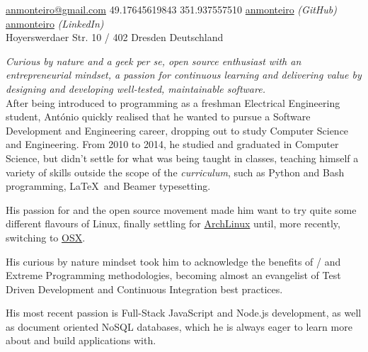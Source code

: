 \documentclass[10pt,a4paper]{article}
\begin{document}
\sloppy  %



\nobreakvspace{0.3em}  %

\noindent\href{mailto:anmonteiro.at.gmail.dot.com}{anmonteiro\mbox{}@\mbox{}gmail.com}\sbull
\textsmaller{+}49.17645619843\sbull
\textsmaller{+}351.937557510\sbull
{\newnums \href{http://www.github.com/anmonteiro}{anmonteiro}} \emph{(GitHub)}\sbull
\href{http://www.linkedin.com/in/anmonteiro}{anmonteiro} \emph{(LinkedIn)}
\\
Hoyerswerdaer Str. 10 / 402 Dresden\sbull
Deutschland

\spacedhrule{0.9em}{-0.4em}  %


\vspace{-1.3em}  %
\begin{multicols}{2}  %
\emph{Curious by nature and a geek \emph{per se}, open source enthusiast with an entrepreneurial mindset, a passion for continuous learning and delivering value by designing and developing well-tested, maintainable software.}\\

After being introduced to programming as a freshman Electrical Engineering student, António quickly realised that he wanted to pursue a Software Development and Engineering career, dropping out to study Computer Science and Engineering. From 2010 to 2014, he studied and graduated in Computer Science, but didn't settle for what was being taught in classes, teaching himself a variety of skills outside the scope of the \emph{curriculum}, such as Python and Bash programming, \LaTeX\ and Beamer typesetting.

His passion for  and the open source movement made him want to try quite some different flavours of Linux, finally settling for \href{https://www.archlinux.org/}{ArchLinux} until, more recently, switching to \href{http://www.apple.com/osx/}{OSX}.

His curious by nature mindset took him to acknowledge the benefits of / and Extreme Programming methodologies, becoming almost an evangelist of Test Driven Development and Continuous Integration best practices.

His most recent passion is Full-Stack JavaScript and Node.js development, as well as document oriented NoSQL databases, which he is always eager to learn more about and build applications with.
\end{multicols}
\end{document}
